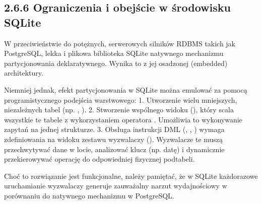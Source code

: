 \documentclass[a4paper,11pt,english,openany,oneside]{sphinxmanual}
\begin{document}
\subsection{2.6.6 Ograniczenia i obejście w środowisku SQLite}
\label{\detokenize{rozdzial_2/rozdzial_26/index:ograniczenia-i-obejscie-w-srodowisku-sqlite}}
\sphinxAtStartPar
W przeciwieństwie do potężnych, serwerowych silników RDBMS takich jak PostgreSQL, lekka i plikowa biblioteka SQLite  natywnego mechanizmu partycjonowania deklaratywnego. Wynika to z jej osadzonej (embedded) architektury.

\sphinxAtStartPar
Niemniej jednak, efekt partycjonowania w SQLite można emulować za pomocą programistycznego podejścia warstwowego:
1.  Utworzenie wielu mniejszych, niezależnych tabel (np. , ).
2.  Stworzenie wspólnego widoku (), który scala wszystkie te tabele z wykorzystaniem operatora . Umożliwia to wykonywanie zapytań  na jednej strukturze.
3.  Obsługa instrukcji DML (, , ) wymaga zdefiniowania na widoku zestawu wyzwalaczy (). Wyzwalacze te muszą przechwytywać dane w locie, analizować klucz (np. datę) i dynamicznie przekierowywać operację do odpowiedniej fizycznej pod\sphinxhyphen{}tabeli.

\sphinxAtStartPar
Choć to rozwiązanie jest funkcjonalne, należy pamiętać, że w SQLite każdorazowe uruchamianie wyzwalaczy generuje zauważalny narzut wydajnościowy w porównaniu do natywnego mechanizmu w PostgreSQL.

\sphinxstepscope
\end{document}
